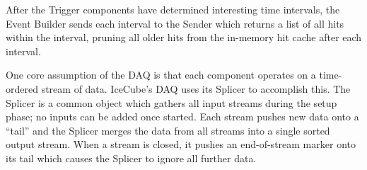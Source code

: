 
After the Trigger components have determined interesting time intervals, the
Event Builder sends each interval to the Sender which returns a list
of all hits within the interval, pruning all older
hits from the in-memory hit cache after each interval.


One core assumption of the DAQ is that each component operates on a
time-ordered stream of data.  IceCube's DAQ uses its Splicer to
accomplish this.  The Splicer is a common object which gathers all input
streams during the setup phase; no inputs can be added once started.  Each
stream pushes new data onto a ``tail'' and the Splicer merges
the data from all streams into a single sorted output stream.  When a
stream is closed, it pushes an end-of-stream marker onto its tail which causes
the Splicer to ignore all further data.



